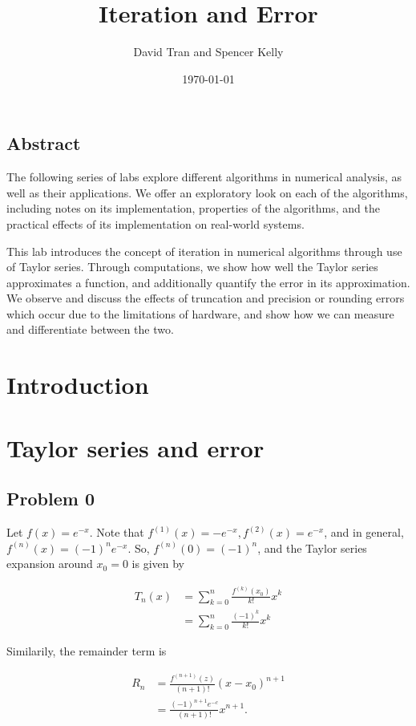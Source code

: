 \documentclass[letter,11pt]{article}
\title{Iteration and Error}
\author{David Tran and Spencer Kelly}
\date{\today}
\begin{document}
\maketitle

\subsection*{Abstract}
The following series of labs explore different algorithms in numerical analysis, as well as their applications. We offer an exploratory look on each of the algorithms, including notes on its implementation, properties of the algorithms, and the practical effects of its implementation on real-world systems.

This lab introduces the concept of iteration in numerical algorithms through use of Taylor series. Through computations, we show how well the Taylor series approximates a function, and additionally quantify the error in its approximation. We observe and discuss the effects of truncation and precision or rounding errors which occur due to the limitations of hardware, and show how we can measure and differentiate between the two.

\section{Introduction}

\section{Taylor series and error}

\setcounter{subsection}{-1}
\subsection{Problem 0}
Let $f(x) = e^{-x}$. Note that $f^{(1)}(x) = -e^{-x}, f^{(2)}(x) = e^{-x}$, and in general, $f^{(n)}(x) = (-1)^ne^{-x}$. So, $f^{(n)}(0) = (-1)^n$, and the Taylor series expansion around $x_0 = 0$ is given by

\begin{align*}
T_n(x) &= \sum_{k = 0}^n \frac{f^{(k)}(x_0)}{k!} x^k \\
&= \sum_{k = 0}^n \frac{(-1)^k}{k!}x^k
\end{align*}

Similarily, the remainder term is

\begin{align*}
R_n &= \frac{f^{(n + 1)}(z)}{(n + 1)!}(x - x_0)^{n + 1} \\
&= \frac{(-1)^{n + 1} e^{-c}}{(n + 1)!}x^{n + 1}.
\end{align*}
\end{document}
